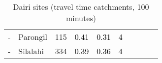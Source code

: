 \begin{table}[ht]
\begin{tabular}{C{0.03\textwidth}C{0.12\textwidth}C{0.09\textwidth}C{0.08\textwidth}C{0.08\textwidth}C{0.08\textwidth}C{0.07\textwidth}C{0.07\textwidth}C{0.07\textwidth}C{0.07\textwidth}}
  {-} & Parongil & 115 & \textcolor[HTML]{000000}{0.41} & \textcolor[HTML]{000000}{0.31} & \textcolor[HTML]{000000}{4} &  &  &  &  \\ 
  {-} & Silalahi & 334 & \textcolor[HTML]{000000}{0.39} & \textcolor[HTML]{000000}{0.36} & \textcolor[HTML]{000000}{4} &  &  &  &  \\ 
  \end{tabular}
\endgroup
\caption{Dairi sites (travel time catchments, 100 minutes)} 
\label{tab:dairi_time}
\end{table}
